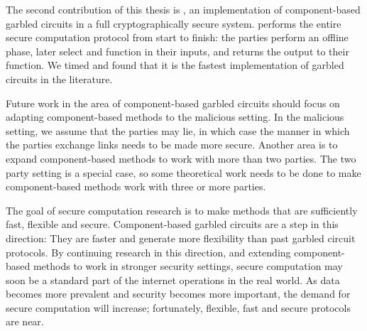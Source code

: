 The second contribution of this thesis is \CompGC, an implementation of component-based garbled circuits in a full cryptographically secure system.
\CompGC performs the entire secure computation protocol from start to finish: the parties perform an offline phase, later select and function in their inputs, and \CompGC returns the output to their function. 
We timed \CompGC and found that it is the fastest implementation of garbled circuits in the literature.

Future work in the area of component-based garbled circuits should focus on adapting component-based methods to the malicious setting.
In the malicious setting, we assume that the parties may lie, in which case the manner in which the parties exchange links needs to be made more secure.
Another area is to expand component-based methods to work with more than two parties.
The two party setting is a special case, so some theoretical work needs to be done to make component-based methods work with three or more parties.

The goal of secure computation research is to make methods that are sufficiently fast, flexible and secure.
Component-based garbled circuits are a step in this direction: They are faster and generate more flexibility than past garbled circuit protocols.
By continuing research in this direction, and extending component-based methods to work in stronger security settings, secure computation may soon be a standard part of the internet operations in the real world.
As data becomes more prevalent and security becomes more important, the demand for secure computation will increase; fortunately, flexible, fast and secure protocols are near.

